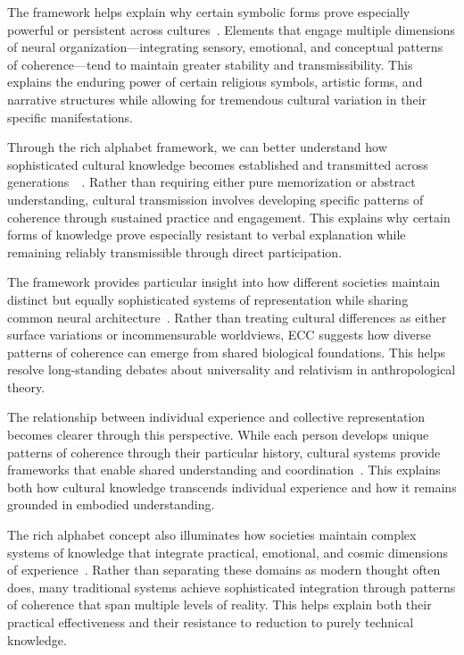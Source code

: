 The framework helps explain why certain symbolic forms prove especially powerful or persistent across cultures~\cite{armstrong1981powers,keane2003semiotics}. Elements that engage multiple dimensions of neural organization—integrating sensory, emotional, and conceptual patterns of coherence—tend to maintain greater stability and transmissibility. This explains the enduring power of certain religious symbols, artistic forms, and narrative structures while allowing for tremendous cultural variation in their specific manifestations.

Through the rich alphabet framework, we can better understand how sophisticated cultural knowledge becomes established and transmitted across generations~~\cite{whitehouse2004modes,hutchins1995cognition}. Rather than requiring either pure memorization or abstract understanding, cultural transmission involves developing specific patterns of coherence through sustained practice and engagement. This explains why certain forms of knowledge prove especially resistant to verbal explanation while remaining reliably transmissible through direct participation.

The framework provides particular insight into how different societies maintain distinct but equally sophisticated systems of representation while sharing common neural architecture~\cite{bateson1972steps,latour2005reassembling}. Rather than treating cultural differences as either surface variations or incommensurable worldviews, ECC suggests how diverse patterns of coherence can emerge from shared biological foundations. This helps resolve long-standing debates about universality and relativism in anthropological theory.

The relationship between individual experience and collective representation becomes clearer through this perspective. While each person develops unique patterns of coherence through their particular history, cultural systems provide frameworks that enable shared understanding and coordination~\cite{shore1996culture,bourdieu1990logic}. This explains both how cultural knowledge transcends individual experience and how it remains grounded in embodied understanding.

The rich alphabet concept also illuminates how societies maintain complex systems of knowledge that integrate practical, emotional, and cosmic dimensions of experience~\cite{wagner2016invention,tsing2015mushroom}. Rather than separating these domains as modern thought often does, many traditional systems achieve sophisticated integration through patterns of coherence that span multiple levels of reality. This helps explain both their practical effectiveness and their resistance to reduction to purely technical knowledge.

